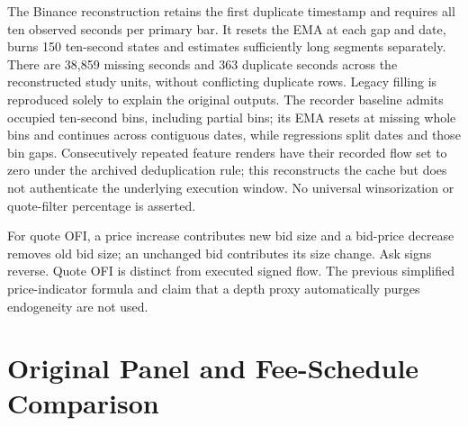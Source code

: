 \documentclass[12pt]{article}
\theoremstyle{definition}
\theoremstyle{remark}
\begin{document}
The Binance reconstruction retains the first duplicate timestamp and requires all ten observed seconds per primary bar. It resets the EMA at each gap and date, burns 150 ten-second states and estimates sufficiently long segments separately. There are 38,859 missing seconds and 363 duplicate seconds across the reconstructed study units, without conflicting duplicate rows. Legacy filling is reproduced solely to explain the original outputs. The recorder baseline admits occupied ten-second bins, including partial bins; its EMA resets at missing whole bins and continues across contiguous dates, while regressions split dates and those bin gaps. Consecutively repeated feature renders have their recorded flow set to zero under the archived deduplication rule; this reconstructs the cache but does not authenticate the underlying execution window. No universal winsorization or quote-filter percentage is asserted.

For quote OFI, a price increase contributes new bid size and a bid-price decrease removes old bid size; an unchanged bid contributes its size change. Ask signs reverse. Quote OFI is distinct from executed signed flow. The previous simplified price-indicator formula and claim that a depth proxy automatically purges endogeneity are not used.

\section{Original Panel and Fee-Schedule Comparison}
\label{sec:baseline_natural_exp}
\end{document}
